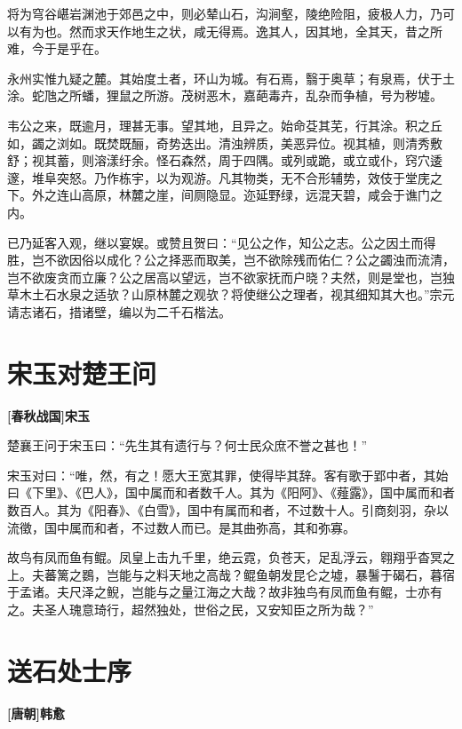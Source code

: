 \documentclass[UTF8,titlepage,oneside]{ctexbook}
\begin{document}
将为穹谷嵁岩渊池于郊邑之中，则必辇山石，沟涧壑，陵绝险阻，疲极人力，乃可以有为也。然而求天作地生之状，咸无得焉。逸其人，因其地，全其天，昔之所难，今于是乎在。


永州实惟九疑之麓。其始度土者，环山为城。有石焉，翳于奥草；有泉焉，伏于土涂。蛇虺之所蟠，狸鼠之所游。茂树恶木，嘉葩毒卉，乱杂而争植，号为秽墟。


韦公之来，既逾月，理甚无事。望其地，且异之。始命芟其芜，行其涂。积之丘如，蠲之浏如。既焚既酾，奇势迭出。清浊辨质，美恶异位。视其植，则清秀敷舒；视其蓄，则溶漾纡余。怪石森然，周于四隅。或列或跪，或立或仆，窍穴逶邃，堆阜突怒。乃作栋宇，以为观游。凡其物类，无不合形辅势，效伎于堂庑之下。外之连山高原，林麓之崖，间厕隐显。迩延野绿，远混天碧，咸会于谯门之内。


已乃延客入观，继以宴娱。或赞且贺曰：“见公之作，知公之志。公之因土而得胜，岂不欲因俗以成化？公之择恶而取美，岂不欲除残而佑仁？公之蠲浊而流清，岂不欲废贪而立廉？公之居高以望远，岂不欲家抚而户晓？夫然，则是堂也，岂独草木土石水泉之适欤？山原林麓之观欤？将使继公之理者，视其细知其大也。”宗元请志诸石，措诸壁，编以为二千石楷法。



\chapter*{宋玉对楚王问}
\begin{center}
	\textbf{[春秋战国]宋玉}
\end{center}


楚襄王问于宋玉曰：“先生其有遗行与？何士民众庶不誉之甚也！”


宋玉对曰：“唯，然，有之！愿大王宽其罪，使得毕其辞。客有歌于郢中者，其始曰《下里》、《巴人》，国中属而和者数千人。其为《阳阿》、《薤露》，国中属而和者数百人。其为《阳春》、《白雪》，国中有属而和者，不过数十人。引商刻羽，杂以流徵，国中属而和者，不过数人而已。是其曲弥高，其和弥寡。


故鸟有凤而鱼有鲲。凤皇上击九千里，绝云霓，负苍天，足乱浮云，翱翔乎杳冥之上。夫蕃篱之鷃，岂能与之料天地之高哉？鲲鱼朝发昆仑之墟，暴鬐于碣石，暮宿于孟诸。夫尺泽之鲵，岂能与之量江海之大哉？故非独鸟有凤而鱼有鲲，士亦有之。夫圣人瑰意琦行，超然独处，世俗之民，又安知臣之所为哉？”



\chapter*{送石处士序}
\begin{center}
	\textbf{[唐朝]韩愈}
\end{center}
\end{document}
